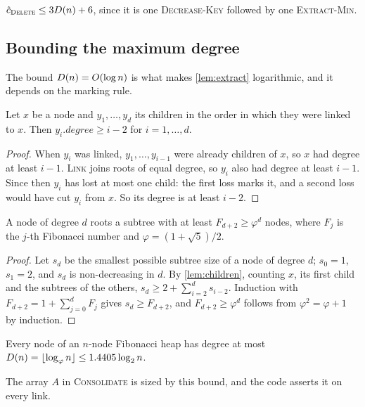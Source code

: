 \begin{lemma}\(\hat c_{\textsc{Delete}}\le 3D(n)+6\), since it is one \textsc{Decrease-Key} followed by one \textsc{Extract-Min}.\end{lemma}

\subsection{Bounding the maximum degree}
The bound \(D(n)=O(\log n)\) is what makes \cref{lem:extract} logarithmic, and it depends on the marking rule.

\begin{lemma}\label{lem:children}
Let \(x\) be a node and \(y_1,\dots,y_d\) its children in the order in which they were linked to \(x\). Then
\(y_i.\mathit{degree}\ge i-2\) for \(i=1,\dots,d\).
\end{lemma}
\begin{proof}
When \(y_i\) was linked, \(y_1,\dots,y_{i-1}\) were already children of \(x\), so \(x\) had degree at least \(i-1\).
\textsc{Link} joins roots of equal degree, so \(y_i\) also had degree at least \(i-1\). Since then \(y_i\) has lost at
most one child: the first loss marks it, and a second loss would have cut \(y_i\) from \(x\). So its degree is at
least \(i-2\).
\end{proof}

\begin{lemma}\label{lem:size}
A node of degree \(d\) roots a subtree with at least \(F_{d+2}\ge\varphi^{d}\) nodes, where \(F_j\) is the
\(j\)-th Fibonacci number and \(\varphi=(1+\sqrt5)/2\).
\end{lemma}
\begin{proof}
Let \(s_d\) be the smallest possible subtree size of a node of degree \(d\); \(s_0=1\), \(s_1=2\), and \(s_d\) is
non-decreasing in \(d\). By \cref{lem:children}, counting \(x\), its first child and the subtrees of the others,
\(s_d\ge 2+\sum_{i=2}^{d}s_{i-2}\). Induction with \(F_{d+2}=1+\sum_{j=0}^{d}F_j\) gives \(s_d\ge F_{d+2}\), and
\(F_{d+2}\ge\varphi^{d}\) follows from \(\varphi^2=\varphi+1\) by induction.
\end{proof}

\begin{corollary}\label{cor:degree}
Every node of an \(n\)-node Fibonacci heap has degree at most \(D(n)=\lfloor\log_\varphi n\rfloor\le1.4405\log_2 n\).
\end{corollary}
\noindent The array \(A\) in \textsc{Consolidate} is sized by this bound, and the code asserts it on every link.

